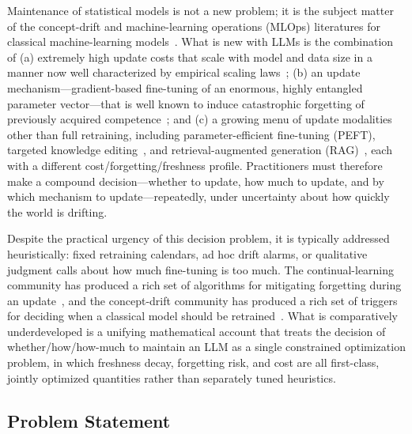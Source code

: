 \documentclass[electronics,article,submit,pdftex,moreauthors]{Definitions/mdpi}
\begin{document}
Maintenance of statistical models is not a new problem; it is the subject matter of the concept-drift and machine-learning operations (MLOps) literatures for classical machine-learning models~\cite{Lu2019,Mahadevan2023}. What is new with LLMs is the combination of (a) extremely high update costs that scale with model and data size in a manner now well characterized by empirical scaling laws~\cite{Hoffmann2022,Kaplan2020}; (b) an update mechanism---gradient-based fine-tuning of an enormous, highly entangled parameter vector---that is well known to induce catastrophic forgetting of previously acquired competence~\cite{Kirkpatrick2017,Luo2023,Shi2024}; and (c) a growing menu of update modalities other than full retraining, including parameter-efficient fine-tuning (PEFT), targeted knowledge editing~\cite{WangS2024,Zhang2024}, and retrieval-augmented generation (RAG)~\cite{Gao2023}, each with a different cost/forgetting/freshness profile. Practitioners must therefore make a compound decision---whether to update, how much to update, and by which mechanism to update---repeatedly, under uncertainty about how quickly the world is drifting.

Despite the practical urgency of this decision problem, it is typically addressed heuristically: fixed retraining calendars, ad hoc drift alarms, or qualitative judgment calls about how much fine-tuning is too much. The continual-learning community has produced a rich set of algorithms for mitigating forgetting during an update~\cite{Kirkpatrick2017,Shi2024,Wu2024}, and the concept-drift community has produced a rich set of triggers for deciding when a classical model should be retrained~\cite{Lu2019,Mahadevan2023}. What is comparatively underdeveloped is a unifying mathematical account that treats the decision of whether/how/how-much to maintain an LLM as a single constrained optimization problem, in which freshness decay, forgetting risk, and cost are all first-class, jointly optimized quantities rather than separately tuned heuristics.

\subsection{Problem Statement}
\end{document}
